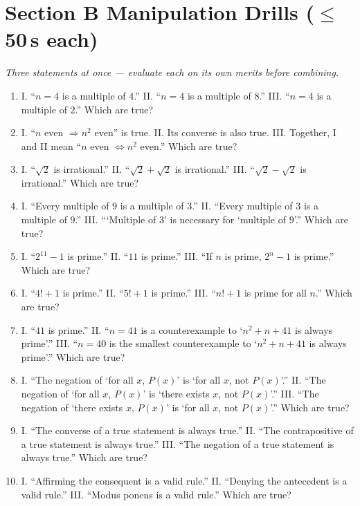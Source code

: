 \documentclass[11pt,a4paper]{article}
\begin{document}
\section*{Section B \quad Manipulation Drills \hfill{\normalfont\small($\leq$50\,s each)}}

\noindent\textit{Three statements at once --- evaluate each on its own merits before combining.}

\begin{enumerate}

\item I. ``$n=4$ is a multiple of $4$.'' II. ``$n=4$ is a multiple of $8$.'' III. ``$n=4$ is a multiple of $2$.'' Which are true?

\item I. ``$n$ even $\Rightarrow n^2$ even'' is true. II. Its converse is also true. III. Together, I and II mean ``$n$ even $\iff n^2$ even.'' Which are true?

\item I. ``$\sqrt2$ is irrational.'' II. ``$\sqrt2+\sqrt2$ is irrational.'' III. ``$\sqrt2-\sqrt2$ is irrational.'' Which are true?

\item I. ``Every multiple of $9$ is a multiple of $3$.'' II. ``Every multiple of $3$ is a multiple of $9$.'' III. ```Multiple of $3$' is necessary for `multiple of $9$'.'' Which are true?

\item I. ``$2^{11}-1$ is prime.'' II. ``$11$ is prime.'' III. ``If $n$ is prime, $2^n-1$ is prime.'' Which are true?

\item I. ``$4!+1$ is prime.'' II. ``$5!+1$ is prime.'' III. ``$n!+1$ is prime for all $n$.'' Which are true?

\item I. ``$41$ is prime.'' II. ``$n=41$ is a counterexample to `$n^2+n+41$ is always prime'.'' III. ``$n=40$ is the smallest counterexample to `$n^2+n+41$ is always prime'.'' Which are true?

\item I. ``The negation of `for all $x$, $P(x)$' is `for all $x$, not $P(x)$'.'' II. ``The negation of `for all $x$, $P(x)$' is `there exists $x$, not $P(x)$'.'' III. ``The negation of `there exists $x$, $P(x)$' is `for all $x$, not $P(x)$'.'' Which are true?

\item I. ``The converse of a true statement is always true.'' II. ``The contrapositive of a true statement is always true.'' III. ``The negation of a true statement is always true.'' Which are true?

\item I. ``Affirming the consequent is a valid rule.'' II. ``Denying the antecedent is a valid rule.'' III. ``Modus ponens is a valid rule.'' Which are true?

\end{enumerate}
\end{document}
